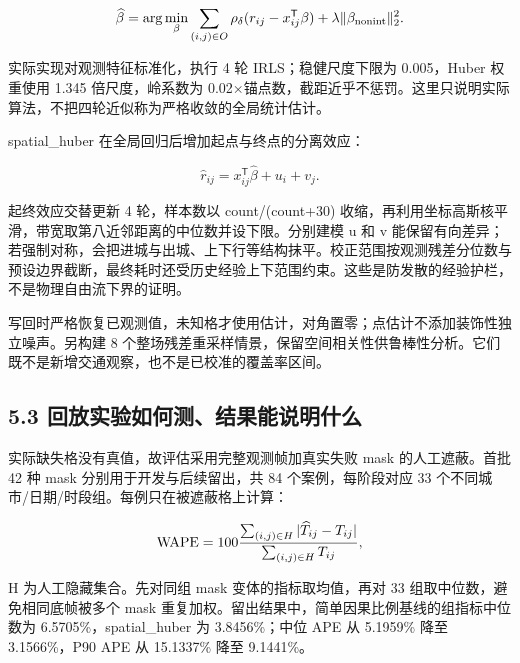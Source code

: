 \documentclass[UTF8,10pt,a4paper,fontset=fandol]{ctexart}
\begin{document}
\begin{equation}
\widehat\beta=\arg\min_\beta
\sum_{(i,j)\in O}\rho_\delta(r_{ij}-x_{ij}^{\mathsf T}\beta)
+\lambda\|\beta_{\rm nonint}\|_2^2.
\end{equation}

实际实现对观测特征标准化，执行 4 轮 IRLS；稳健尺度下限为 0.005，Huber 权重使用 1.345 倍尺度，岭系数为 0.02\ensuremath{\times}锚点数，截距近乎不惩罚。这里只说明实际算法，不把四轮近似称为严格收敛的全局统计估计。


spatial\_\allowbreak{}huber 在全局回归后增加起点与终点的分离效应：


\begin{equation}
\widehat r_{ij}=x_{ij}^{\mathsf T}\widehat\beta+u_i+v_j.
\end{equation}

起终效应交替更新 4 轮，样本数以 count/\allowbreak{}(count+30) 收缩，再利用坐标高斯核平滑，带宽取第八近邻距离的中位数并设下限。分别建模 u 和 v 能保留有向差异；若强制对称，会把进城与出城、上下行等结构抹平。校正范围按观测残差分位数与预设边界截断，最终耗时还受历史经验上下范围约束。这些是防发散的经验护栏，不是物理自由流下界的证明。


写回时严格恢复已观测值，未知格才使用估计，对角置零；点估计不添加装饰性独立噪声。另构建 8 个整场残差重采样情景，保留空间相关性供鲁棒性分析。它们既不是新增交通观察，也不是已校准的覆盖率区间。


\subsection*{5.3 回放实验如何测、结果能说明什么}


实际缺失格没有真值，故评估采用完整观测帧加真实失败 mask 的人工遮蔽。首批 42 种 mask 分别用于开发与后续留出，共 84 个案例，每阶段对应 33 个不同城市/\allowbreak{}日期/\allowbreak{}时段组。每例只在被遮蔽格上计算：


\begin{equation}
{\rm WAPE}=100\frac{\sum_{(i,j)\in H}|\widehat T_{ij}-T_{ij}|}
{\sum_{(i,j)\in H}T_{ij}},
\end{equation}

H 为人工隐藏集合。先对同组 mask 变体的指标取均值，再对 33 组取中位数，避免相同底帧被多个 mask 重复加权。留出结果中，简单因果比例基线的组指标中位数为 6.5705\%，spatial\_\allowbreak{}huber 为 3.8456\%；中位 APE 从 5.1959\% 降至 3.1566\%，P90 APE 从 15.1337\% 降至 9.1441\%。
\end{document}
